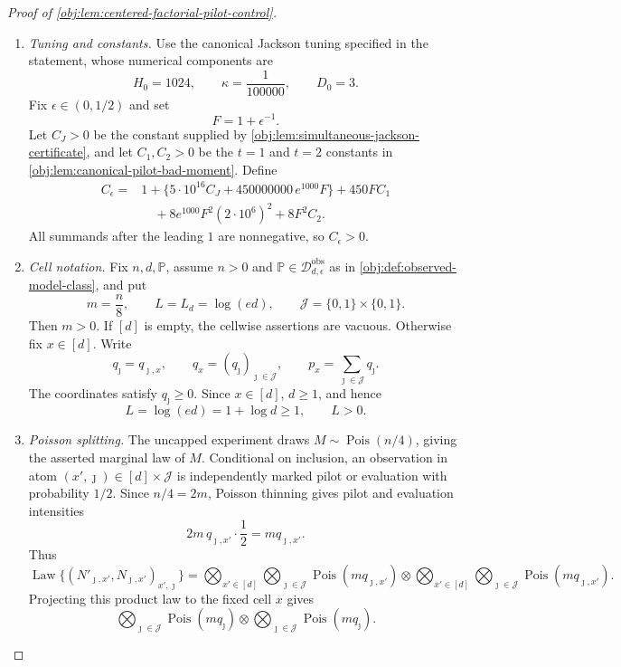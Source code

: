 \begin{proof}[Proof of \cref{obj:lem:centered-factorial-pilot-control}]
\begin{enumerate}
\item \emph{Tuning and constants.}
Use the canonical Jackson tuning specified in the statement, whose numerical components are
\[
H_0=1024,\qquad \kappa=\frac1{100000},\qquad D_0=3 .
\]
Fix \(\epsilon\in(0,1/2)\) and set
\[
F=1+\epsilon^{-1}.
\]
Let \(C_J>0\) be the constant supplied by \cref{obj:lem:simultaneous-jackson-certificate}, and let
\(C_1,C_2>0\) be the \(t=1\) and \(t=2\) constants in
\cref{obj:lem:canonical-pilot-bad-moment}.  Define
\[
\begin{aligned}
C_\epsilon
={}&1+\{5\cdot10^{16}C_J+450000000\,e^{1000}F\}+450FC_1\\
&\quad+8e^{1000}F^2(2\cdot10^6)^2+8F^2C_2 .
\end{aligned}
\]
All summands after the leading \(1\) are nonnegative, so \(C_\epsilon>0\).

\item \emph{Cell notation.}
Fix \(n,d,\mathbb P\), assume \(n>0\) and
\(\mathbb P\in\mathcal D_{d,\epsilon}^{\mathrm{obs}}\) as in
\cref{obj:def:observed-model-class}, and put
\[
m=\frac n8,\qquad L=L_d=\log(ed),\qquad
\mathcal J=\{0,1\}\times\{0,1\}.
\]
Then \(m>0\).  If \([d]\) is empty, the cellwise assertions are vacuous.  Otherwise fix
\(x\in[d]\).  Write
\[
q_\jmath=q_{\jmath,x},\qquad
q_x=(q_\jmath)_{\jmath\in\mathcal J},\qquad
p_x=\sum_{\jmath\in\mathcal J}q_\jmath .
\]
The coordinates satisfy \(q_\jmath\ge0\).  Since \(x\in[d]\), \(d\ge1\), and hence
\[
L=\log(ed)=1+\log d\ge1,\qquad L>0 .
\]

\item \emph{Poisson splitting.}
The uncapped experiment draws \(M\sim\operatorname{Pois}(n/4)\), giving the asserted marginal law of \(M\).  Conditional on inclusion, an observation in atom \((x',\jmath)\in[d]\times\mathcal J\) is independently marked pilot or evaluation with probability \(1/2\).  Since \(n/4=2m\), Poisson thinning gives pilot and evaluation intensities
\[
2m\,q_{\jmath,x'}\cdot\frac12=mq_{\jmath,x'}.
\]
Thus
\[
\operatorname{Law}\{(N'_{\jmath,x'},N_{\jmath,x'})_{x',\jmath}\}
=
\bigotimes_{x'\in[d]}\bigotimes_{\jmath\in\mathcal J}
\operatorname{Pois}(m q_{\jmath,x'})
\otimes
\bigotimes_{x'\in[d]}\bigotimes_{\jmath\in\mathcal J}
\operatorname{Pois}(m q_{\jmath,x'}) .
\]
Projecting this product law to the fixed cell \(x\) gives
\[
\bigotimes_{\jmath\in\mathcal J}\operatorname{Pois}(m q_{\jmath})
\otimes
\bigotimes_{\jmath\in\mathcal J}\operatorname{Pois}(m q_{\jmath}) .
\]


\end{enumerate}
\end{proof}
